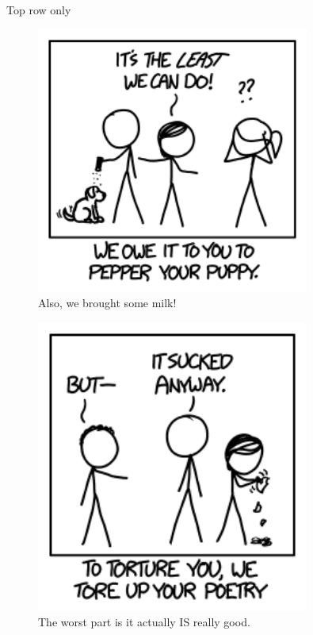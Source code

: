 {{Top row only}

\begin{figure}[!htbp]
\centering
\includegraphics[scale=0.5, max width=0.8\textwidth]{imgs/a/75/t9_puppy.png}
\caption{Also, we brought some milk!}
\end{figure}

\begin{figure}[!htbp]
\centering
\includegraphics[scale=0.5, max width=0.8\textwidth]{imgs/a/75/t9_poetry.png}
\caption{The worst part is it actually IS really good.}
\end{figure}

}
